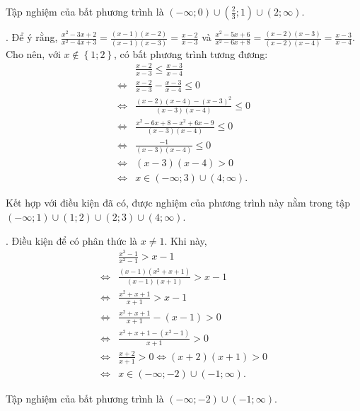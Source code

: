 Tập nghiệm của bất phương trình là $\left(-\infty; 0\right) \cup \left(\frac{2}{3}; 1\right) \cup \left(2; \infty\right)$.

. Để ý rằng, $\frac{x^2 - 3x + 2}{x^2 - 4x + 3} = \frac{(x - 1)(x - 2)}{(x - 1)(x - 3)} = \frac{x - 2}{x - 3}$ và $\frac{x^2 - 5x + 6}{x^2 - 6x + 8} = \frac{(x - 2)(x - 3)}{(x - 2)(x - 4)} = \frac{x - 3}{x - 4}$. Cho nên, với $x \notin \left\{1; 2\right\}$, có bất phương trình tương đương:
\begin{align*}
   &\frac{x - 2}{x - 3} \leq \frac{x - 3}{x - 4} \\
   \iff &\frac{x - 2}{x - 3} - \frac{x - 3}{x - 4} \leq 0 \\
   \iff &\frac{(x - 2)(x - 4) - (x - 3)^2}{(x - 3)(x - 4)} \leq 0 \\
   \iff &\frac{x^2 - 6x + 8 - x^2 + 6x - 9}{(x - 3)(x - 4)} \leq 0 \\
   \iff &\frac{-1}{(x - 3)(x - 4)} \leq 0 \\
   \iff &(x - 3)(x - 4) > 0 \\
   \iff &x \in \left(-\infty; 3\right) \cup \left(4; \infty\right).
\end{align*}

Kết hợp với điều kiện đã có, được nghiệm của phương trình này nằm trong tập $\left(-\infty; 1\right) \cup \left(1; 2\right) \cup \left(2; 3\right) \cup \left(4; \infty\right)$.

. Điều kiện để có phân thức là $x \neq 1$. Khi này,
\begin{align*}
   &\frac{x^3 - 1}{x^2 - 1} > x - 1 \\
   \iff &\frac{(x - 1)\left(x^2 + x + 1\right)}{(x - 1)(x + 1)} > x - 1 \\
   \iff &\frac{x^2 + x + 1}{x + 1} > x - 1 \\
   \iff &\frac{x^2 + x + 1}{x + 1} - (x - 1) > 0 \\
   \iff &\frac{x^2 + x + 1 - \left(x^2 - 1\right)}{x + 1} > 0 \\
   \iff &\frac{x + 2}{x + 1} > 0 
   \iff (x + 2)(x + 1) > 0 \\ 
   \iff &x \in \left(-\infty; -2\right) \cup \left(-1; \infty\right).
\end{align*}

Tập nghiệm của bất phương trình là $\left(-\infty; -2\right) \cup \left(-1; \infty\right)$.

